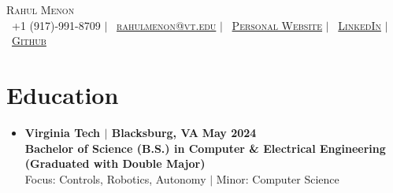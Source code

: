 \documentclass[letterpaper,11pt]{article}
\begin{document}
\pagestyle{empty} %




\begin{center}
    \Huge \scshape Rahul Menon \\
    \small
    \faPhone\ +1 (917)-991-8709 $|$ 
    \faEnvelope\ \href{mailto:rahulmenon@vt.edu}{rahulmenon@vt.edu} $|$ 
    \faGlobe\ \href{https://rmenon.netlify.app/}{Personal Website} $|$ 
    \faLinkedinSquare\ \href{https://www.linkedin.com/in/rahul-ajk-m}{LinkedIn} $|$ 
    \faGithub\ \href{https://github.com/rm1738}{Github}
\end{center}

\vspace{-1.2\baselineskip} %

\section{Education}
\begin{itemize}[leftmargin=0mm, label={}, itemsep=0pt]
  \item \textbf{Virginia Tech $|$ \textnormal{Blacksburg, VA}} \hfill {\textbf{May 2024}} \\
  \textbf{Bachelor of Science  (B.S.) in Computer \& Electrical Engineering (Graduated with Double Major)} \\
Focus: Controls, Robotics, Autonomy $|$ Minor: Computer Science
\end{itemize}

\vspace{-0.75\baselineskip} %


\end{document}
